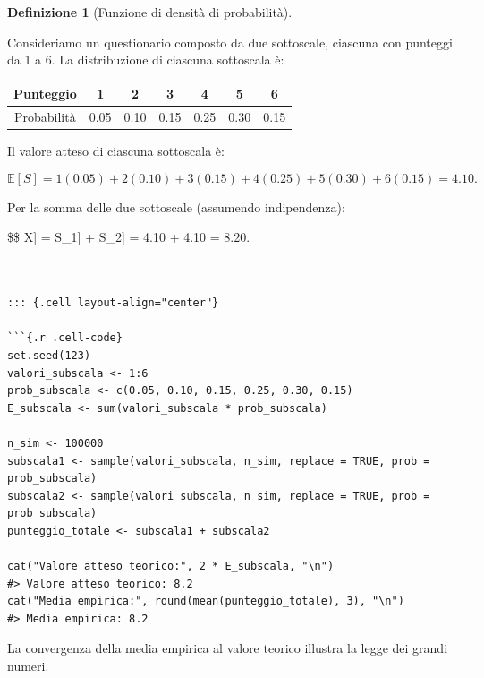 \documentclass[
  italian,
  letterpaper,
  a4paper,
  11pt,
  open=any]{scrbook}
\newcounter{none} %
\theoremstyle{plain}
\theoremstyle{definition}
\theoremstyle{definition}
\newtheorem{definition}{Definizione}[chapter]
\theoremstyle{remark}
\begin{document}
\begin{definition}[Funzione di densità di
probabilità]
\begin{tcolorbox}[enhanced jigsaw, arc=.35mm, bottomrule=.15mm, bottomtitle=1mm, breakable, colback=white, colbacktitle=quarto-callout-note-color!10!white, colframe=quarto-callout-note-color-frame, coltitle=black, left=2mm, leftrule=.75mm, opacityback=0, opacitybacktitle=0.6, rightrule=.15mm, title=\textcolor{quarto-callout-note-color}{\faInfo}\hspace{0.5em}{Esempio: punteggio totale su due subscale}, titlerule=0mm, toprule=.15mm, toptitle=1mm]

Consideriamo un questionario composto da due sottoscale, ciascuna con
punteggi da 1 a 6. La distribuzione di ciascuna sottoscala è:

{\def\LTcaptype{none} %
\begin{longtable}[]{@{}ccccccc@{}}
\toprule\noalign{}
Punteggio & 1 & 2 & 3 & 4 & 5 & 6 \\
\midrule\noalign{}
\endhead
\bottomrule\noalign{}
\endlastfoot
Probabilità & 0.05 & 0.10 & 0.15 & 0.25 & 0.30 & 0.15 \\
\end{longtable}
}

Il valore atteso di ciascuna sottoscala è:

\[
\mathbb{E}[S] = 1(0.05) + 2(0.10) + 3(0.15) + 4(0.25) + 5(0.30) + 6(0.15) = 4.10.
\]

Per la somma delle due sottoscale (assumendo indipendenza):

\$\$ \mathbb{E}{[}X{]} = \mathbb{E}{[}S\_1{]} + \mathbb{E}{[}S\_2{]} =
4.10 + 4.10 = 8.20.

\begin{verbatim}


::: {.cell layout-align="center"}

```{.r .cell-code}
set.seed(123)
valori_subscala <- 1:6
prob_subscala <- c(0.05, 0.10, 0.15, 0.25, 0.30, 0.15)
E_subscala <- sum(valori_subscala * prob_subscala)

n_sim <- 100000
subscala1 <- sample(valori_subscala, n_sim, replace = TRUE, prob = prob_subscala)
subscala2 <- sample(valori_subscala, n_sim, replace = TRUE, prob = prob_subscala)
punteggio_totale <- subscala1 + subscala2

cat("Valore atteso teorico:", 2 * E_subscala, "\n")
#> Valore atteso teorico: 8.2
cat("Media empirica:", round(mean(punteggio_totale), 3), "\n")
#> Media empirica: 8.2
\end{verbatim}

\end{tcolorbox}

La convergenza della media empirica al valore teorico illustra la legge
dei grandi numeri.

\end{definition}
\end{document}
